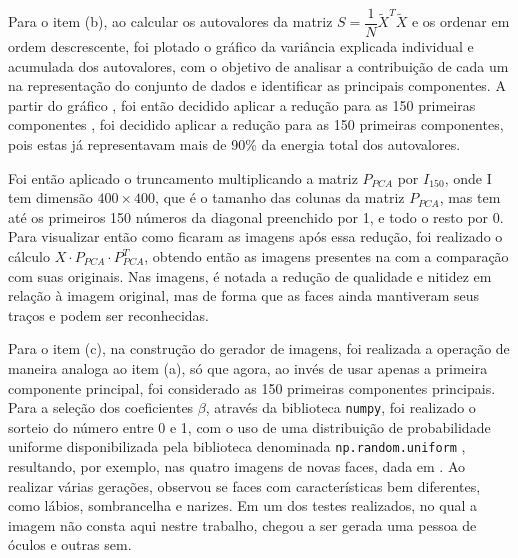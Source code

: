 \documentclass[a4paper, 11pt]{article}
\begin{document}

Para o item (b), ao calcular os autovalores da matriz $S = \dfrac{1}{N} \tilde{X}^T \tilde{X}$ e os ordenar em ordem descrescente, foi plotado o gráfico da variância explicada individual e acumulada dos autovalores, com o objetivo de analisar a contribuição de cada um na representação do conjunto de dados e identificar as principais componentes. A partir do gráfico , foi então decidido aplicar a redução para as 150 primeiras componentes , foi decidido aplicar a redução para as 150 primeiras componentes, pois estas já representavam mais de 90\% da energia total dos autovalores.

Foi então aplicado o truncamento multiplicando a matriz $P_{PCA}$ por $I_{150}$, onde I tem dimensão $400\times 400$, que é o tamanho das colunas da matriz $P_{PCA}$, mas tem até os primeiros 150 números da diagonal preenchido por 1, e todo o resto por 0. Para visualizar então como ficaram as imagens após essa redução, foi realizado o cálculo $X \cdot P_{PCA} \cdot P_{PCA}^T$, obtendo então as imagens presentes na  com a comparação com suas originais. Nas imagens, é notada a redução de qualidade e nitidez em relação à imagem original, mas de forma que as faces ainda mantiveram seus traços e podem ser reconhecidas.


Para o item (c), na construção do gerador de imagens, foi realizada a operação de maneira analoga ao item (a), só que agora, ao invés de usar apenas a primeira componente principal, foi considerado as 150 primeiras componentes principais. Para a seleção dos coeficientes $\beta$, através da biblioteca \texttt{numpy}, foi realizado o sorteio do número entre 0 e 1, com o uso de uma distribuição de probabilidade uniforme disponibilizada pela biblioteca denominada \texttt{np.random.uniform} , resultando, por exemplo, nas quatro imagens de novas faces, dada em . Ao realizar várias gerações, observou se faces com características bem diferentes, como lábios, sombrancelha e narizes. Em um dos testes realizados, no qual a imagem não consta aqui nestre trabalho, chegou a ser gerada uma pessoa de óculos e outras sem.
\end{document}
